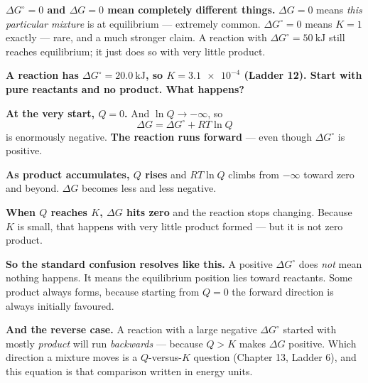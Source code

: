 \documentclass{apchem-worksheet}
\begin{document}
\begin{apctrap}
\textbf{$\Delta G^{\circ} = 0$ and $\Delta G = 0$ mean completely
different things.} $\Delta G = 0$ means \emph{this particular mixture}
is at equilibrium --- extremely common. $\Delta G^{\circ} = 0$ means
$K = 1$ exactly --- rare, and a much stronger claim. A reaction with
$\Delta G^{\circ} = \SI{+50}{\kilo\joule}$ still reaches equilibrium;
it just does so with very little product.
\end{apctrap}

\begin{workedexample}
\textbf{A reaction has $\Delta G^{\circ} = \SI{+20.0}{\kilo\joule}$, so
$K = \num{3.1e-4}$ (Ladder 12). Start with pure reactants and no
product. What happens?}

\textbf{At the very start, $Q = 0$.} And $\ln Q \to -\infty$, so
\[ \Delta G = \Delta G^{\circ} + RT\ln Q \]
is enormously negative. \textbf{The reaction runs forward} --- even
though $\Delta G^{\circ}$ is positive.

\textbf{As product accumulates, $Q$ rises} and $RT \ln Q$ climbs from
$-\infty$ toward zero and beyond. $\Delta G$ becomes less and less
negative.

\textbf{When $Q$ reaches $K$, $\Delta G$ hits zero} and the reaction
stops changing. Because $K$ is small, that happens with very little
product formed --- but it is not zero product.

\textbf{So the standard confusion resolves like this.} A positive
$\Delta G^{\circ}$ does \emph{not} mean nothing happens. It means the
equilibrium position lies toward reactants. Some product always forms,
because starting from $Q = 0$ the forward direction is always initially
favoured.

\textbf{And the reverse case.} A reaction with a large negative
$\Delta G^{\circ}$ started with mostly \emph{product} will run
\emph{backwards} --- because $Q > K$ makes $\Delta G$ positive. Which
direction a mixture moves is a $Q$-versus-$K$ question (Chapter 13,
Ladder 6), and this equation is that comparison written in energy
units.
\end{workedexample}
\end{document}
